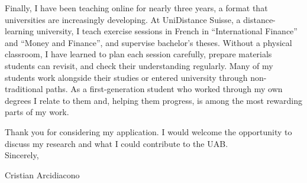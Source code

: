 \documentclass[11pt]{article}
\begin{document}
Finally, I have been teaching online for nearly three years, a format that universities are increasingly developing. At UniDistance Suisse, a distance-learning university, I teach exercise sessions in French in ``International Finance'' and ``Money and Finance'', and supervise bachelor's theses. Without a physical classroom, I have learned to plan each session carefully, prepare materials students can revisit, and check their understanding regularly. Many of my students work alongside their studies or entered university through non-traditional paths. As a first-generation student who worked through my own degrees I relate to them and, helping them progress, is among the most rewarding parts of my work. %

Thank you for considering my application. I would welcome the opportunity to discuss my research and what I could contribute to the UAB. \\

Sincerely,

Cristian Arcidiacono
\end{document}
